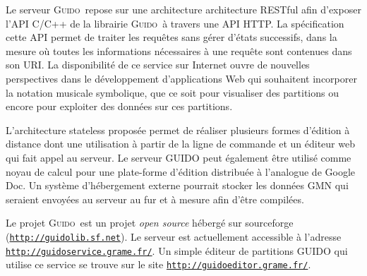 \documentclass{article}
\newcommand{\icode}[1]		{{\small \texttt{#1}}}
\newcommand{\guido}		{\textsc{Guido}}
\begin{document}
Le serveur \guido\ repose sur une architecture architecture RESTful afin d'exposer l'API C/C++ de la librairie \guido\ à travers une  API HTTP. La spécification cette API permet de traiter les requêtes sans gérer d'états successifs, dans la mesure où toutes les informations nécessaires à une requête sont contenues dans son URI. 
La disponibilité de ce service sur Internet ouvre de nouvelles perspectives dans le développement d'applications Web qui souhaitent incorporer la notation musicale symbolique, que ce soit pour visualiser des partitions ou encore pour exploiter des données sur ces partitions. 

L'architecture stateless proposée permet de réaliser plusieurs
formes d'édition à distance dont une utilisation à partir de la ligne de
commande et un éditeur web qui fait appel au serveur. Le serveur GUIDO peut également être
utilisé comme noyau de calcul pour une plate-forme d'édition distribuée à l'analogue de
Google Doc. Un système d'hébergement externe pourrait stocker les données GMN qui seraient
envoyées au serveur au fur et à mesure afin d'être compilées.

Le projet \guido\ est un projet \emph{open source} hébergé sur sourceforge (\icode{\url{http://guidolib.sf.net}}). Le serveur est actuellement accessible à l'adresse \\
\icode{\url{http://guidoservice.grame.fr/}}. Un simple éditeur de partitions
GUIDO qui utilise ce service se trouve sur le site \icode{\url{http://guidoeditor.grame.fr/}}.

\balance


\end{document}
